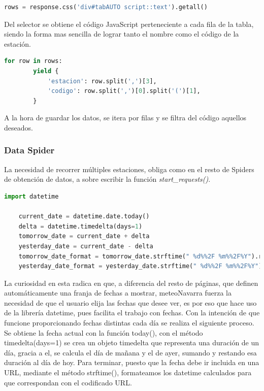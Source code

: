 \begin{lstlisting}[language=Python, caption={Selector en \textit{parse()} de MeteoNavarra Code Spider}]
	rows = response.css('div#tabAUTO script::text').getall()
\end{lstlisting}

Del selector se obtiene el código JavaScript perteneciente a cada fila de la tabla, siendo la forma mas sencilla de lograr tanto el nombre como el código de la estación.

\begin{lstlisting}[language=Python, caption={Guardado de datos de MeteoNavarra Code Spider}]	
	for row in rows:
		yield {
			'estacion': row.split(',')[3],
			'codigo': row.split(',')[0].split('(')[1],
		}
\end{lstlisting}

A la hora de guardar los datos, se itera por filas y se filtra del código aquellos deseados.

\subsubsection{Data Spider}
La necesidad de recorrer múltiples estaciones, obliga como en el resto de Spiders de obtención de datos, a sobre escribir la función \textit{start\_requests()}.

\begin{lstlisting}[language=Python, caption={Uso de fechas en función \textit{start\_requests()} MeteoNavarra Data Spider}]
	import datetime

	current_date = datetime.date.today()
	delta = datetime.timedelta(days=1)
	tomorrow_date = current_date + delta
	yesterday_date = current_date - delta
	tomorrow_date_format = tomorrow_date.strftime(" %d%%2F %m%%2F%Y").replace(' 0', '')
	yesterday_date_format = yesterday_date.strftime(" %d%%2F %m%%2F%Y").replace(' 0', '')
\end{lstlisting}

La curiosidad en esta radica en que, a diferencia del resto de páginas, que definen automáticamente una franja de fechas a mostrar, meteoNavarra fuerza la necesidad de que el usuario elija las fechas que desee ver, es por eso que hace uso de la librería datetime, pues facilita el trabajo con fechas.\newline
\newline
Con la intención de que funcione proporcionando fechas distintas cada día se realiza el siguiente proceso. Se obtiene la fecha actual con la función today(), con el método timedelta(days=1) se crea un objeto timedelta que representa una duración de un día, gracia a el, se calcula el día de mañana y el de ayer, sumando y restando esa duración al día de hoy. Para terminar, puesto que la fecha debe ir incluida en una URL, mediante el método strftime(), formateamos los datetime calculados para que correspondan con el codificado URL.\newline
\newline

